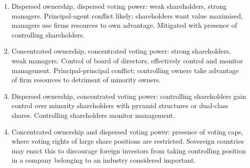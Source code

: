 \begin{remark} 
\begin{enumerate}[label=\roman*.]
\setlength{\itemsep}{0pt}
\item Dispersed ownership, dispersed voting power: weak shareholders, strong managers. Principal-agent conflict likely; shareholders want value maximised, managers use firms resources to own advantage. Mitigated with presence of controlling shareholders.
\item Concentrated ownership, concentrated voting power: strong shareholders, weak managers. Control of board of directors, effectively control and monitor management. Principal-principal conflict; controlling owners take advantage of firm resources to detriment of minority owners.
\item Dispersed ownership, concentrated voting power: controlling shareholders gain control over minority shareholders with pyramid structures or dual-class shares. Controlling shareholders monitor management.
\item Concentrated ownership and dispersed voting power: presence of voting caps, where voting rights of large share positions are restricted. Sovereign countries may enact this to discourage foreign investors from taking controlling position in a company belonging to an industry considered important.
\end{enumerate}
\end{remark}

